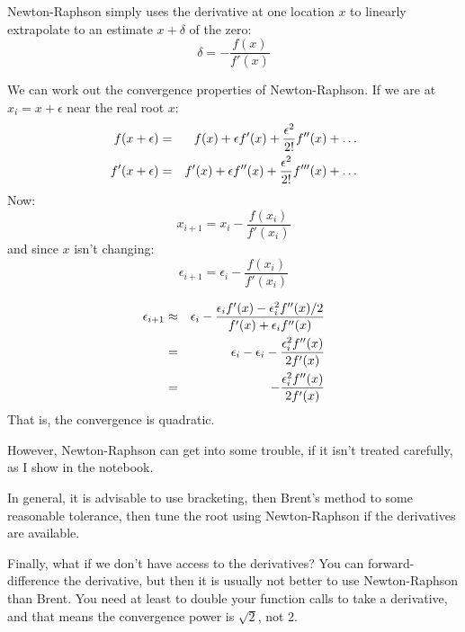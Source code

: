 Newton-Raphson simply uses the derivative at one location $x$ to linearly
extrapolate to an estimate $x+\delta$ of the zero:
\begin{equation}
\delta = - \frac{f(x)}{f'(x)}
\end{equation}

We can work out the convergence properties of Newton-Raphson. If we
are at $x_i = x+\epsilon$ near the real root $x$:
\begin{eqnarray}
f(x+\epsilon) &=& f(x) + \epsilon f'(x) + \frac{\epsilon^2}{2!} f''(x) +
\ldots \cr
f'(x+\epsilon) &=& f'(x) + \epsilon f''(x) + \frac{\epsilon^2}{2!}
f'''(x) + \ldots \cr
\end{eqnarray}
Now:
\begin{equation}
x_{i+1} = x_i - \frac{f(x_i)}{f'(x_i)}
\end{equation}
and since $x$ isn't changing:
\begin{equation}
\epsilon_{i+1} = \epsilon_i - \frac{f(x_i)}{f'(x_i)}
\end{equation}


\begin{answer}
\begin{eqnarray}
  \epsilon_{i+1} &\approx&
  \epsilon_i - \frac{\epsilon_i f'(x) - \epsilon_i^2
  f''(x) /2}{f'(x) + \epsilon_i f''(x)} \cr
  &=& \epsilon_i - \epsilon_i - \frac{\epsilon_i^2 f''(x)}{2 f'(x)} \cr
  &=& - \frac{\epsilon_i^2 f''(x)}{2 f'(x)}
\end{eqnarray}
That is, the convergence is quadratic.
\end{answer}

However, Newton-Raphson can get into some trouble, if it isn't treated
carefully, as I show in the notebook.

In general, it is advisable to use bracketing, then Brent's method to
some reasonable tolerance, then tune the root using Newton-Raphson if
the derivatives are available.

Finally, what if we don't have access to the derivatives? You can
forward-difference the derivative, but then it is usually not better
to use Newton-Raphson than Brent. You need at least to double your
function calls to take a derivative, and that means the convergence
power is $\sqrt{2}$, not 2. 
